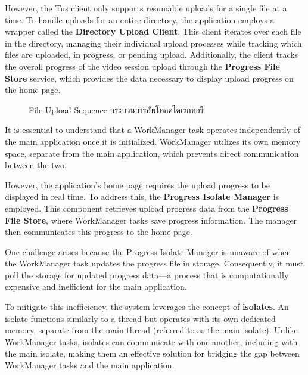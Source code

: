 However, the Tus client only supports resumable uploads for a single file at a time. To handle uploads for an entire directory, the application employs a wrapper called the \textbf{Directory Upload Client}. This client iterates over each file in the directory, managing their individual upload processes while tracking which files are uploaded, in progress, or pending upload. Additionally, the client tracks the overall progress of the video session upload through the \textbf{Progress File Store} service, which provides the data necessary to display upload progress on the home page.

\begin{figure}[h]
    \begin{center}
    
    \end{center}
    \newcommand{\DirectoryUploadSequence}{\ifenglish File Upload Sequence \else กระบวนการอัพโหลดไดเรกทอรี  \fi}
    \caption[\DirectoryUploadSequence]{\DirectoryUploadSequence}
    \label{fig directory upload quence}
\end{figure}


It is essential to understand that a WorkManager task operates independently of the main application once it is initialized. WorkManager utilizes its own memory space, separate from the main application, which prevents direct communication between the two.

However, the application's home page requires the upload progress to be displayed in real time. To address this, the \textbf{Progress Isolate Manager} is employed. This component retrieves upload progress data from the \textbf{Progress File Store}, where WorkManager tasks save progress information. The manager then communicates this progress to the home page.

One challenge arises because the Progress Isolate Manager is unaware of when the WorkManager task updates the progress file in storage. Consequently, it must poll the storage for updated progress data—a process that is computationally expensive and inefficient for the main application.

To mitigate this inefficiency, the system leverages the concept of \textbf{isolates}. An isolate functions similarly to a thread but operates with its own dedicated memory, separate from the main thread (referred to as the main isolate). Unlike WorkManager tasks, isolates can communicate with one another, including with the main isolate, making them an effective solution for bridging the gap between WorkManager tasks and the main application.

